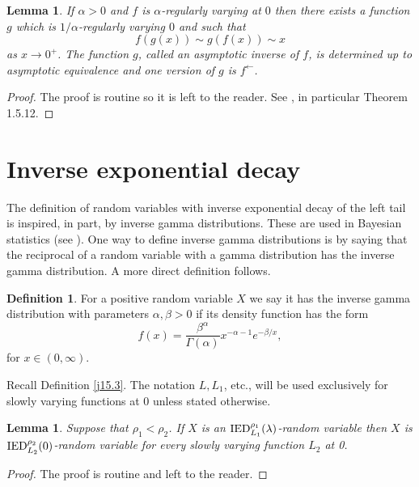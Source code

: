 \documentclass[bj]{imsart}
\numberwithin{equation}{section}
\newcommand{\IED}{{\rm IED}}
\newcommand{\1}{\mathbf{1}}
\newtheorem{lemma}[thm]{Lemma}
\theoremstyle{definition}
\newtheorem{defin}[thm]{Definition}
\begin{document}
\begin{lemma}\label{assyptoicInverseLemma}
If $\alpha>0$ and $f$ is $\alpha$-regularly varying at  $0$ then there exists 
a function $g$ which is
 $1/\alpha$-regularly varying  $0$ and such that 
\begin{equation}
f(g(x))\sim g(f(x))\sim x  \label{eq:aymptoticInverse}
\end{equation}
as $x\to  0^+$. The function $g$, called an asymptotic inverse of $f$, is determined up to asymptotic equivalence and one version of $g$ is $f^{\leftarrow}$.  
\end{lemma}
\begin{proof}
The proof is routine so it is left to the reader. See \cite[Sect. 1.5.7]{regularVariation}, in particular Theorem 1.5.12.
\end{proof}

\section{Inverse exponential decay}\label{sec:IGFT}\rm

The definition of random variables with inverse exponential decay of the left tail is inspired, in part, by 
inverse gamma distributions. These are  used in Bayesian statistics (see  \cite{HoffBayes}). One way to define inverse gamma distributions is by saying that the reciprocal of a random variable with a gamma distribution has the inverse gamma distribution. A more direct definition follows.

\begin{defin}\label{n16.1}
For a positive random variable $X$ we say it has the inverse gamma distribution with parameters $\alpha,\beta >0$ 
if its density function has the form 
$$f(x)=\frac{\beta^\alpha}{\Gamma(\alpha)}x^{-\alpha-1}e^{-\beta/x},$$
for $x\in (0,\infty)$.
\end{defin}

Recall Definition \ref{j15.3}.
The notation $L, L_1$, etc., will be used exclusively for slowly varying functions at 0 unless stated otherwise.

\begin{lemma}\label{lemma:rho1LessRho2}
Suppose that $\rho_1<\rho_2$. If $X$ is an $\IED^{\rho_1}_{L_1}(\lambda)$-random variable then $X$ is $\IED^{\rho_2}_{L_2}(0)$-random variable 
for every slowly varying function $L_2$ at 0. 
\end{lemma}
\begin{proof}
The proof is routine and left to the reader.
\end{proof}
\end{document}
